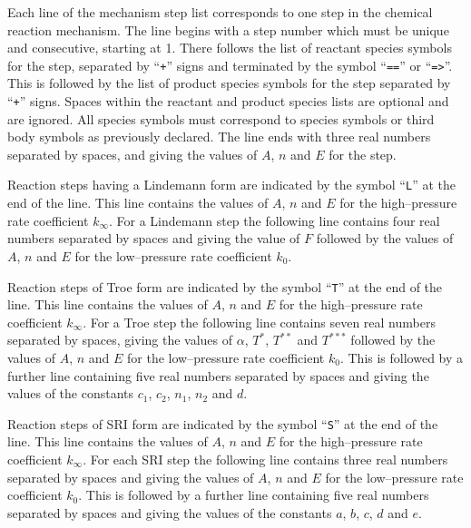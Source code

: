 \documentclass[dvips]{article}
\begin{document}
Each line of the mechanism step list corresponds to one step in the
chemical reaction mechanism.  The line begins with a step number which
must be unique and consecutive, starting at 1.  There follows the list
of reactant species symbols for the step, separated by ``{\tt +}'' signs and
terminated by the symbol ``{\tt ==}'' or ``{\tt =>}''.  This is followed by the list of
product species symbols for the step separated by ``{\tt +}'' signs.  Spaces
within the reactant and product species lists are optional and are ignored.
All species symbols must correspond to species symbols or third body
symbols as previously declared.  The line ends with three real numbers
separated by spaces, and giving the values of $A$, $n$ and $E$ for the step.  

Reaction steps having a Lindemann form are indicated by the symbol
``{\tt L}'' at the end of the line.  This line contains the
values of $A$, $n$ and $E$ for the high--pressure rate coefficient $k_{\infty}$.
For a Lindemann step the following line contains four real numbers
separated by spaces and giving the value of $F$ followed by the 
values of $A$, $n$ and $E$ for the low--pressure rate coefficient
$k_{0}$.

Reaction steps of Troe form are indicated by the symbol
``{\tt T}'' at the end of the line.  This line contains the
values of $A$, $n$ and $E$ for the high--pressure rate coefficient $k_{\infty}$.
For a Troe step the following line contains seven real numbers
separated by spaces, giving the values of $\alpha$, $T^{*}$, $T^{**}$ and
$T^{***}$ followed by the values of $A$, $n$ and $E$ for the low--pressure
rate coefficient $k_{0}$.  This is followed by a further line containing
five real numbers separated by spaces and giving the values of the
constants $c_{1}$, $c_{2}$, $n_{1}$, $n_{2}$ and $d$.

Reaction steps of SRI form are indicated by the symbol
``{\tt S}'' at the end of the line.  This line contains the
values of $A$, $n$ and $E$ for the high--pressure rate coefficient $k_{\infty}$.
For each SRI step the following line contains three real numbers
separated by spaces and giving the values of $A$, $n$ and $E$ for the
low--pressure rate coefficient $k_{0}$.  This is followed by a further
line containing five real numbers separated by spaces and giving the
values of the constants $a$, $b$, $c$, $d$ and $e$.
\end{document}
